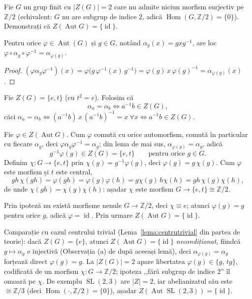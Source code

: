 \begin{problema}
Fie $G$ un grup finit cu $|Z(G)|=2$ care nu admite niciun morfism surjectiv
pe $\mathbb{Z}/2$ (echivalent: $G$ nu are subgrup de indice $2$, adică
$\operatorname{Hom}(G,\mathbb{Z}/2)=\{0\}$). Demonstrați că
$Z(\operatorname{Aut}G)=\{\operatorname{id}\}$.
\end{problema}

\begin{lemat}\label{lema:conjinn}
Pentru orice $\varphi\in\operatorname{Aut}(G)$ și $g\in G$, notând
$\alpha_{g}(x)=gxg^{-1}$, are loc
$\varphi\circ\alpha_{g}\circ\varphi^{-1}=\alpha_{\varphi(g)}$.
\end{lemat}

\begin{proof}
$(\varphi\alpha_{g}\varphi^{-1})(x)=\varphi\bigl(g\,\varphi^{-1}(x)\,g^{-1}\bigr)
=\varphi(g)\,x\,\varphi(g)^{-1}=\alpha_{\varphi(g)}(x)$.
\end{proof}

\begin{solutie}
Fie $Z(G)=\{e,t\}$ (cu $t^{2}=e$). Folosim că
\[
  \alpha_{a}=\alpha_{b}\iff a^{-1}b\in Z(G),
\]
căci $\alpha_{a}=\alpha_{b}\iff (a^{-1}b)\,x\,(a^{-1}b)^{-1}=x\ \forall x
\iff a^{-1}b\in Z(G)$.

Fie $\varphi\in Z(\operatorname{Aut}G)$. Cum $\varphi$ comută cu orice
automorfism, comută în particular cu fiecare $\alpha_{g}$, deci
$\varphi\alpha_{g}\varphi^{-1}=\alpha_{g}$; din lema de mai sus,
$\alpha_{\varphi(g)}=\alpha_{g}$, adică
\[
  g^{-1}\varphi(g)\in Z(G)=\{e,t\}\qquad\text{pentru orice }g\in G.
\]
Definim $\chi:G\to\{e,t\}$ prin $\chi(g)=g^{-1}\varphi(g)$, deci
$\varphi(g)=g\,\chi(g)$. Cum $\varphi$ este morfism și $t$ este central,
\[
  gh\,\chi(gh)=\varphi(gh)=\varphi(g)\varphi(h)=g\chi(g)\,h\chi(h)=gh\,\chi(g)\chi(h),
\]
de unde $\chi(gh)=\chi(g)\chi(h)$: așadar $\chi$ este morfism
$G\to\{e,t\}\cong\mathbb{Z}/2$.

Prin ipoteză nu există morfisme nenule $G\to\mathbb{Z}/2$, deci
$\chi\equiv e$; atunci $\varphi(g)=g$ pentru orice $g$, adică
$\varphi=\operatorname{id}$. Prin urmare $Z(\operatorname{Aut}G)=\{\operatorname{id}\}$.
\end{solutie}

\begin{obs}
Comparație cu cazul centrului trivial (Lema~\ref{lema:centrutrivial}
din partea de teorie): dacă $Z(G)=\{e\}$, atunci
$Z(\operatorname{Aut}G)=\{\operatorname{id}\}$ \emph{necondiționat},
fiindcă $g\mapsto\alpha_{g}$ e injectivă (Observația (a) de după
aceeași lemă), deci $\alpha_{\varphi(g)}=\alpha_{g}$ forțează direct
$\varphi(g)=g$. La
$|Z(G)|=2$ apare libertatea $\varphi(g)\in\{g,\,tg\}$, codificată de un
morfism $\chi:G\to\mathbb{Z}/2$; ipoteza ,,fără subgrup de indice
$2$'' îl omoară pe $\chi$. De exemplu $\operatorname{SL}(2,3)$ are
$|Z|=2$, iar abelianizatul său este $\cong\mathbb{Z}/3$ (deci
$\operatorname{Hom}(\cdot,\mathbb{Z}/2)=\{0\}$), așadar
$Z(\operatorname{Aut}\operatorname{SL}(2,3))=\{\operatorname{id}\}$.
\end{obs}

